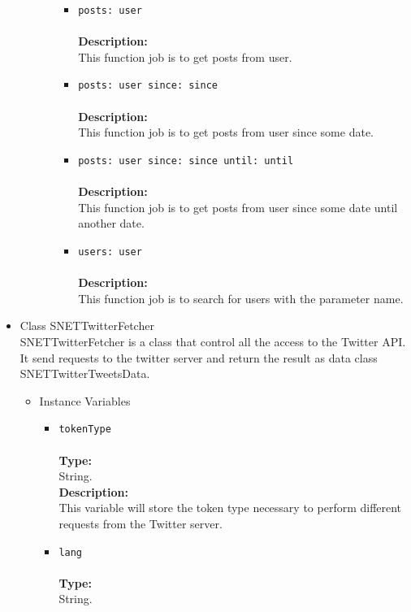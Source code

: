 \begin{itemize}
\begin{itemize}
\begin{itemize}
\begin{itemize}
\item \verb~posts: user~\\\\
\textbf{Description:}\\
      This function job is to get posts from user.\\
\item \verb~posts: user since: since~\\\\
\textbf{Description:}\\
      This function job is to get posts from user since some date.\\
\item \verb~posts: user since: since until: until~\\\\
\textbf{Description:}\\
      This function job is to get posts from user since some date until another date.\\
\item \verb~users: user~\\\\
\textbf{Description:}\\
      This function job is to search for users with the parameter name.\\
\end{itemize}


\end{itemize} %
\end{itemize} %

\item Class SNETTwitterFetcher\\
\label{sec-1-4-1-3}%
SNETTwitterFetcher is a class that control all the access to the Twitter API.\\

   It send requests to the twitter server and return the result as data class SNETTwitterTweetsData.

\begin{itemize}

\item Instance Variables
\label{sec-1-4-1-3-1}%
\begin{itemize}
\item \verb~tokenType~\\\\
\textbf{Type:}\\
     String.\\

     \textbf{Description:}\\
     This variable will store the token type necessary to perform different requests from the Twitter server.\\
\item \verb~lang~\\\\
\textbf{Type:}\\
     String.\\


\end{itemize}
\end{itemize}
\end{itemize}
